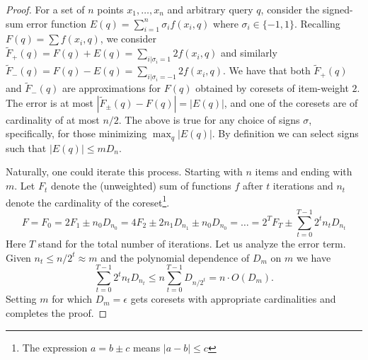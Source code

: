 \documentclass[12pt]{colt2019} %
\newcommand{\eps}{\epsilon}
\begin{document}
\begin{proof}
\noindent For a set of $n$ points $x_1,\ldots,x_n$ and arbitrary query $q$, consider the signed-sum error function $E(q) = \sum_{i=1}^{n} \sigma_i f(x_i,q)$ where $\sigma_i \in \{-1,1\}$.
Recalling $F(q) = \sum f(x_i,q)$, we consider $\tilde F_{+}(q) = F(q) + E(q)   = \sum_{i | \sigma_i=1} 2 f(x_i,q)$ and similarly $\tilde F_{-}(q) = F(q) - E(q)  =  \sum_{i | \sigma_i=-1} 2 f(x_i,q)$. 
We have that both $\tilde F_{+}(q)$ and $\tilde F_{-}(q)$ are approximations for $F(q)$ obtained by coresets of item-weight $2$. 
The error is at most $|\tilde F_{\pm}(q)- F(q)| =  |E(q)|$, and one of the coresets are of cardinality of at most $n/2$. 
The above is true for any choice of signs $\sigma$, specifically, for those minimizing $\max_q | E(q)|$.
By definition we can select signs such that $|E(q)| \le m D_n$. 

Naturally, one could iterate this process. Starting with $n$ items and ending with $m$.
Let $F_t$ denote the (unweighted) sum of functions $f$ after $t$ iterations and $n_t$ denote the cardinality of the coreset\footnote{The expression $a=b \pm c$ means $|a-b| \leq c$}. 
\[
F = F_0 = 2F_1 \pm n_0D_{n_0} = 4F_{2} \pm 2n_1D_{n_1} \pm n_0D_{n_0} = \ldots = 2^T F_T \pm \sum_{t=0}^{T-1} 2^t n_t D_{n_t}
\]
Here $T$ stand for the total number of iterations. Let us analyze the error term.
Given $n_t \le n/2^{t} \approx m$ and the polynomial dependence of $D_m$ on $m$ we have 
$$\sum_{t=0}^{T-1} 2^t n_t D_{n_t} \le n \sum_{t=0}^{T-1} D_{n/2^t} = n\cdot O(D_{m}) . $$ 
Setting $m$ for which $D_{m} = \eps$ gets coresets with appropriate cardinalities and completes the proof.


\end{proof}
\end{document}
